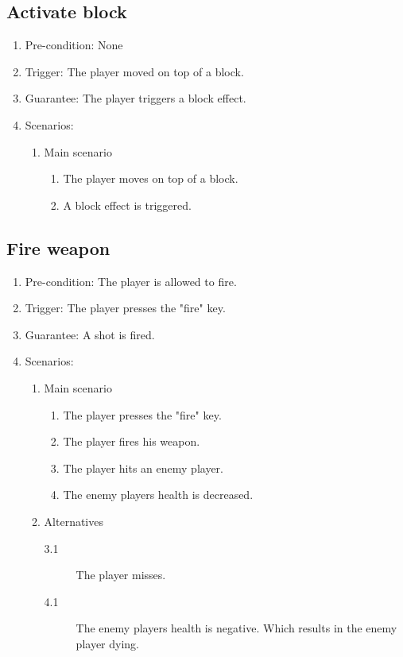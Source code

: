 \documentclass[a4paper,twoside,11pt]{article}
\begin{document}
\subsection*{Activate block}
\begin{enumerate}
\item Pre-condition: None
\item Trigger: The player moved on top of a block.
\item Guarantee: The player triggers a block effect.
\item Scenarios: 
	\begin{enumerate}
	\item Main scenario
		\begin{enumerate}[1)]
		\item The player moves on top of a block.
		\item A block effect is triggered.
		\end{enumerate}
	\end{enumerate}
\end{enumerate}
\subsection*{Fire weapon}
\begin{enumerate}
\item Pre-condition: The player is allowed to fire.
\item Trigger: The player presses the "fire" key.
\item Guarantee: A shot is fired.
\item Scenarios: 
	\begin{enumerate}
	\item Main scenario
		\begin{enumerate}[1)]
		\item The player presses the "fire" key.
		\item The player fires his weapon.
		\item The player hits an enemy player.
		\item The enemy players health is decreased.
		\end{enumerate}
	\item Alternatives
		\begin{description}
		\item[3.1] The player misses.
		\item[4.1] The enemy players health is negative. Which 					results in the enemy player dying.
		\end{description}
	\end{enumerate}
\end{enumerate}
\end{document}
